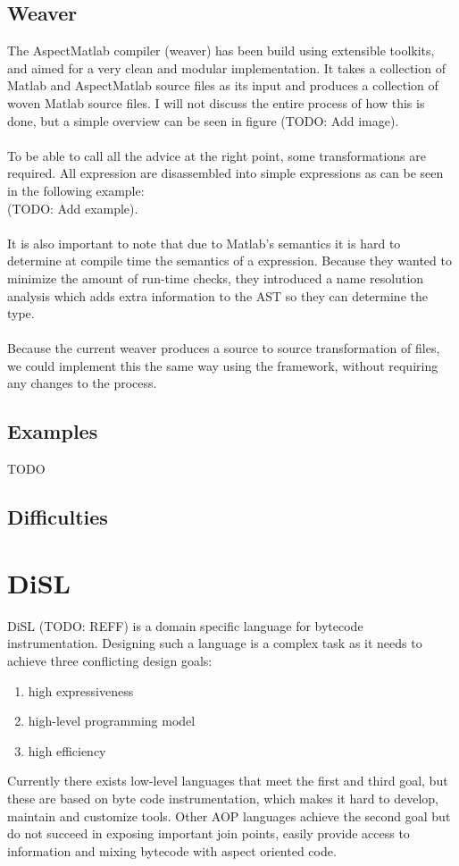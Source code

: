 \documentclass[a4paper]{report}
\begin{document}
\section{Weaver}
The AspectMatlab compiler (weaver) has been build using extensible toolkits, and aimed for a very clean and modular implementation. It takes a collection of Matlab and AspectMatlab source files as its input and produces a collection of woven Matlab source files. I will not discuss the entire process of how this is done, but a simple overview can be seen in figure (TODO: Add image).\\
\\
To be able to call all the advice at the right point, some transformations are required. All expression are disassembled into simple expressions as can be seen in the following example:\\
(TODO: Add example).\\
\\
It is also important to note that due to Matlab's semantics it is hard to determine at compile time the semantics of a expression. Because they wanted to minimize the amount of run-time checks, they introduced a name resolution analysis which adds extra information to the AST so they can determine the type.\\
\\
Because the current weaver produces a source to source transformation of files, we could implement this the same way using the framework, without requiring any changes to the process.

\section{Examples}
TODO

\section{Difficulties}


\chapter{DiSL}
DiSL (TODO: REFF) is a domain specific language for bytecode instrumentation. Designing such a language is a complex task as it needs to achieve three conflicting design goals:
\begin{enumerate}
\item high expressiveness
\item high-level programming model
\item high efficiency
\end{enumerate}
Currently there exists low-level languages that meet the first and third goal, but these are based on byte code instrumentation, which makes it hard to develop, maintain and customize tools. Other AOP languages achieve the second goal but do not succeed in exposing important join points, easily provide access to information and mixing bytecode with aspect oriented code.
\end{document}
